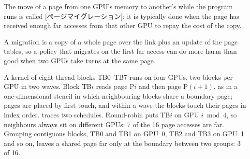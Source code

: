 \documentclass[../main.tex]{subfiles}
\begin{document}
\begin{definition}
  The move of a page from one GPU's memory to another's while the
  program runs is called [ページマイグレーション]; it is typically done when the
  page has received enough far accesses from that other GPU to repay
  the cost of the copy.
\end{definition}

%
A migration is a copy of a whole page over the link plus an update of the
page tables, so a policy that migrates on the first far access can do
more harm than good when two GPUs take turns at the same page.

\begin{example}
  \label{ex:l09-placement}
  A kernel of eight thread blocks TB0--TB7 runs on four GPUs, two blocks
  per GPU in two waves.  Block TB$i$ reads page P$i$ and then page
  P$(i{+}1)$, as in a one-dimensional stencil in which neighbouring
  blocks share a boundary page; pages are placed by first touch, and
  within a wave the blocks touch their pages in index order.
   traces two schedules.  Round-robin puts TB$i$
  on GPU $i \bmod 4$, so neighbours always sit on different GPUs: 7 of
  the 16 page accesses are far.  Grouping contiguous blocks, TB0 and TB1
  on GPU~0, TB2 and TB3 on GPU~1 and so on, leaves a shared page far only
  at the boundary between two groups: 3 of 16.
\end{example}
\end{document}

